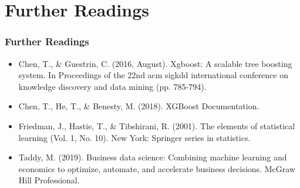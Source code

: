 \documentclass[
  shownotes,
  xcolor={svgnames},
  hyperref={colorlinks,citecolor=DarkBlue,linkcolor=DarkRed,urlcolor=DarkBlue}
  , aspectratio=169]{beamer}
\begin{document}
\section{Further Readings}
\begin{frame}
\frametitle{Further Readings}

\begin{itemize}

  \item Chen, T., \& Guestrin, C. (2016, August). Xgboost: A scalable tree boosting system. In Proceedings of the 22nd acm sigkdd international conference on knowledge discovery and data mining (pp. 785-794).
  \medskip
  \item Chen, T., He, T., \& Benesty, M. (2018). XGBoost Documentation.
  \medskip
  \item Friedman, J., Hastie, T., \& Tibshirani, R. (2001). The elements of statistical learning (Vol. 1, No. 10). New York: Springer series in statistics.
  \medskip
  \item Taddy, M. (2019). Business data science: Combining machine learning and economics to optimize, automate, and accelerate business decisions. McGraw Hill Professional.

  
\end{itemize}

\end{frame}



\end{document}

